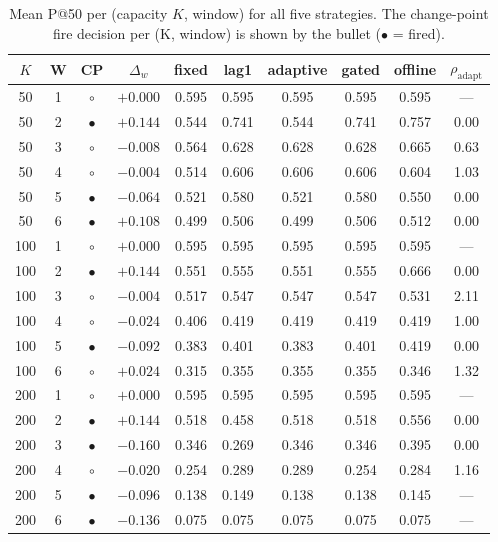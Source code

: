 \begin{table}[!t]
  \caption{Mean P@50 per (capacity $K$, window) for all five strategies. The change-point fire decision per (K, window) is shown by the bullet ($\bullet$ = fired).}
  \label{tab:main}
  \centering
  \small
  \setlength{\tabcolsep}{5pt}
  \begin{tabular}{cccc ccccc c}
    \toprule
    $K$ & W & CP & $\Delta_w$ & fixed & lag1 & adaptive & gated & offline & $\rho_{\mathrm{adapt}}$ \\
    \midrule
    50 & 1 & $\circ$ & $+0.000$ & 0.595 & 0.595 & 0.595 & 0.595 & 0.595 & --- \\
    50 & 2 & $\bullet$ & $+0.144$ & 0.544 & 0.741 & 0.544 & 0.741 & 0.757 & 0.00 \\
    50 & 3 & $\circ$ & $-0.008$ & 0.564 & 0.628 & 0.628 & 0.628 & 0.665 & 0.63 \\
    50 & 4 & $\circ$ & $-0.004$ & 0.514 & 0.606 & 0.606 & 0.606 & 0.604 & 1.03 \\
    50 & 5 & $\bullet$ & $-0.064$ & 0.521 & 0.580 & 0.521 & 0.580 & 0.550 & 0.00 \\
    50 & 6 & $\bullet$ & $+0.108$ & 0.499 & 0.506 & 0.499 & 0.506 & 0.512 & 0.00 \\
    \midrule
    100 & 1 & $\circ$ & $+0.000$ & 0.595 & 0.595 & 0.595 & 0.595 & 0.595 & --- \\
    100 & 2 & $\bullet$ & $+0.144$ & 0.551 & 0.555 & 0.551 & 0.555 & 0.666 & 0.00 \\
    100 & 3 & $\circ$ & $-0.004$ & 0.517 & 0.547 & 0.547 & 0.547 & 0.531 & 2.11 \\
    100 & 4 & $\circ$ & $-0.024$ & 0.406 & 0.419 & 0.419 & 0.419 & 0.419 & 1.00 \\
    100 & 5 & $\bullet$ & $-0.092$ & 0.383 & 0.401 & 0.383 & 0.401 & 0.419 & 0.00 \\
    100 & 6 & $\circ$ & $+0.024$ & 0.315 & 0.355 & 0.355 & 0.355 & 0.346 & 1.32 \\
    \midrule
    200 & 1 & $\circ$ & $+0.000$ & 0.595 & 0.595 & 0.595 & 0.595 & 0.595 & --- \\
    200 & 2 & $\bullet$ & $+0.144$ & 0.518 & 0.458 & 0.518 & 0.518 & 0.556 & 0.00 \\
    200 & 3 & $\bullet$ & $-0.160$ & 0.346 & 0.269 & 0.346 & 0.346 & 0.395 & 0.00 \\
    200 & 4 & $\circ$ & $-0.020$ & 0.254 & 0.289 & 0.289 & 0.254 & 0.284 & 1.16 \\
    200 & 5 & $\bullet$ & $-0.096$ & 0.138 & 0.149 & 0.138 & 0.138 & 0.145 & --- \\
    200 & 6 & $\bullet$ & $-0.136$ & 0.075 & 0.075 & 0.075 & 0.075 & 0.075 & --- \\
    \bottomrule
  \end{tabular}
\end{table}
